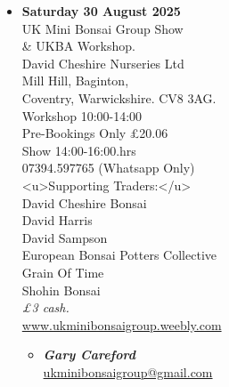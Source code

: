 \begin{itemize}
    \item \textbf{Saturday 30 August 2025}
    \\
    UK Mini Bonsai Group Show \\
    \& UKBA Workshop. \\
    David Cheshire Nurseries Ltd \\
    Mill Hill, Baginton, \\
    Coventry, Warwickshire. CV8 3AG. \\
    Workshop 10:00-14:00 \\
    Pre-Bookings Only £20.06 \\
    Show 14:00-16:00.hrs \\
    07394.597765 (Whatsapp Only) \\
    <u>Supporting Traders:</u> \\
    David Cheshire Bonsai \\
    David Harris \\
    David Sampson \\
    European Bonsai Potters Collective \\
    Grain Of Time \\
    Shohin Bonsai
    \\
    \emph{£3 cash.}
    \\
    \href{https://www.ukminibonsaigroup.weebly.com}{www.ukminibonsaigroup.weebly.com}
    \begin{itemize}
        \item \textbf{\emph{Gary Careford}} \\
        \href{mailto:ukminibonsaigroup@gmail.com}{ukminibonsaigroup@gmail.com} 
    \end{itemize}


\end{itemize}
